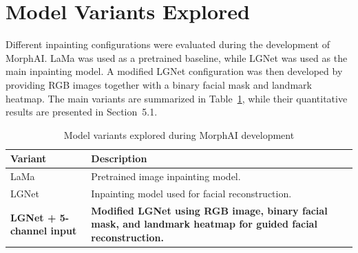 \section{Model Variants Explored}

Different inpainting configurations were evaluated during the development
of MorphAI. LaMa was used as a pretrained baseline, while LGNet was used
as the main inpainting model. A modified LGNet configuration was then
developed by providing RGB images together with a binary facial mask and
landmark heatmap. The main variants are summarized in
Table~\ref{tab:model_variants_ch3}, while their quantitative results are
presented in Section~5.1.

\begin{table}[h!]
\centering
\renewcommand{\arraystretch}{1.4}
\begin{tabular}{|l|p{9cm}|}
\hline
\textbf{Variant} & \textbf{Description} \\ \hline

LaMa & Pretrained image inpainting model. \\ \hline

LGNet & Inpainting model used for facial reconstruction. \\ \hline

\textbf{LGNet + 5-channel input} &
\textbf{Modified LGNet using RGB image, binary facial mask, and landmark
heatmap for guided facial reconstruction.} \\ \hline

\end{tabular}
\caption{Model variants explored during MorphAI development}
\label{tab:model_variants_ch3}
\end{table}